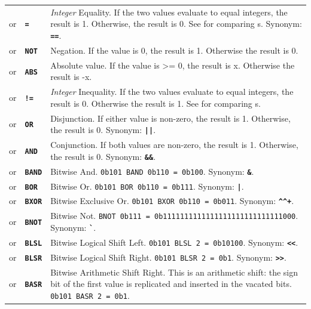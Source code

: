 \documentclass{article}
\def\ttref#1{\ahrefloc{#1}{\tt #1}}
\def\DEFINE#1{{\tt \bf #1}\label{#1}\index{#1}}
\def\DEFSYN#1{{\tt \bf #1}\index{#1}}
\def\t#1{{\tt #1}}
\def\textexcl{!}
\def\textpipe{|}
\begin{document}
\begin{tabular}{cp{10in}|p{10in}}
or & \ttref{value} \DEFINE{=} \ttref{value} & \emph{Integer} Equality. If the two
values evaluate to equal integers, the result is 1. Otherwise, the result
is 0. See \ttref{STRING_COMPARE} for comparing \ttref{String}s. Synonym:
\DEFSYN{==}.
\\
or & \DEFINE{NOT} \ttref{value} & Negation. If the value is 0, the result is 1.
Otherwise the result is 0. \\
or & \DEFINE{ABS} \ttref{value} & Absolute value. If the value is >= 0, the result
is x. Otherwise the result is -x. \\
or & \ttref{value} \DEFINE{\textexcl=} \ttref{value} & \emph{Integer} Inequality. If
the two values evaluate to equal integers, the result is 0. Otherwise the
result is 1. See \ttref{STRING_COMPARE} for comparing \ttref{String}s. \\
or & \ttref{value} \DEFINE{OR} \ttref{value} & Disjunction. If either value is
non-zero, the result is 1. Otherwise, the result is 0. Synonym: \DEFSYN{\textpipe\textpipe}. \\
or & \ttref{value} \DEFINE{AND} \ttref{value} & Conjunction. If both values are
non-zero, the result is 1. Otherwise, the result is 0. Synonym: \DEFSYN{\&\&}. \\

or & \ttref{value} \DEFINE{BAND} \ttref{value} & Bitwise And.
\t{0b101 BAND 0b110 = 0b100}. Synonym: \DEFSYN{\&}.\\
or & \ttref{value} \DEFINE{BOR} \ttref{value} & Bitwise Or.
\t{0b101 BOR 0b110 = 0b111}. Synonym: \DEFSYN{\textpipe}. \\
or & \ttref{value} \DEFINE{BXOR} \ttref{value} & Bitwise Exclusive Or.
\t{0b101 BXOR 0b110 = 0b011}. Synonym: \DEFSYN{\verb+^^+}.  \\
or & \DEFINE{BNOT} \ttref{value} & Bitwise Not.
\t{BNOT 0b111 = 0b1111111111111111111111111111000}. Synonym: \DEFSYN{\verb+`+}. \\
or & \ttref{value} \DEFINE{BLSL} \ttref{value} & Bitwise Logical Shift Left.
\t{0b101 BLSL 2 = 0b10100}. Synonym: \DEFSYN{<<}. \\
or & \ttref{value} \DEFINE{BLSR} \ttref{value} & Bitwise Logical Shift Right.
\t{0b101 BLSR 2 = 0b1}. Synonym: \DEFSYN{>>}. \\
or & \ttref{value} \DEFINE{BASR} \ttref{value} & Bitwise Arithmetic Shift Right.
This is an arithmetic shift: the sign bit of the first value is replicated
and inserted in the vacated bits. \t{0b101 BASR 2 = 0b1}.  \\


\end{tabular}
\end{document}
